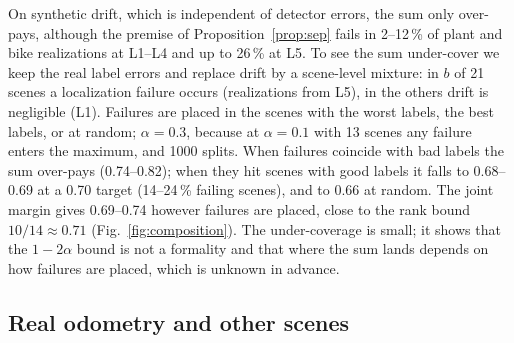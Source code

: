 \documentclass[conference]{IEEEtran}
\theoremstyle{definition}
\begin{document}
On synthetic drift, which is independent of detector errors, the sum only over-pays, although the premise of
Proposition~\ref{prop:sep} fails in 2--12\,\% of plant and bike realizations at L1--L4 and up to 26\,\% at L5. To see the sum
under-cover we keep the real label errors and replace drift by a scene-level mixture: in $b$ of 21 scenes a localization
failure occurs (realizations from L5), in the others drift is negligible (L1). Failures are placed in the scenes with the
worst labels, the best labels, or at random; $\alpha = 0.3$, because at $\alpha = 0.1$ with 13 scenes any failure
enters the maximum, and 1000 splits. When failures coincide with bad labels the sum over-pays (0.74--0.82); when they
hit scenes with good labels it falls to 0.68--0.69 at a 0.70 target (14--24\,\% failing scenes), and to 0.66 at random.
The joint margin gives 0.69--0.74 however failures are placed, close to the rank bound $10/14 \approx 0.71$
(Fig.~\ref{fig:composition}). The under-coverage is small; it shows that the $1 - 2\alpha$ bound is not a formality and
that where the sum lands depends on how failures are placed, which is unknown in advance.

\subsection{Real odometry and other scenes}
\end{document}
